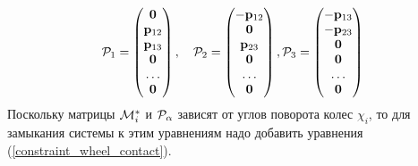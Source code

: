 $$ 
\mathcal{P}_1 = \left(
\begin{matrix}
 \boldsymbol{\mathbf{0}} \\
 \mathbf{p}_{12}\\
\mathbf{p}_{13}\\
\boldsymbol{\mathbf{0}}\\
\dots\\
\boldsymbol{\mathbf{0}}
\end{matrix}
\right),\quad
\mathcal{P}_2 = \left(
\begin{matrix}
-\mathbf{p}_{12}\\
\boldsymbol{\mathbf{0}}\\
\mathbf{p}_{23}\\
\boldsymbol{\mathbf{0}}\\
\dots\\
\boldsymbol{\mathbf{0}}
\end{matrix}
\right),
\mathcal{P}_3 = \left(
\begin{matrix}
-\mathbf{p}_{13}\\
-\mathbf{p}_{23}\\
\boldsymbol{\mathbf{0}}\\
\boldsymbol{\mathbf{0}}\\
\dots\\
\boldsymbol{\mathbf{0}}
\end{matrix}
\right)
$$
Поскольку матрицы $\mathcal{M}^*_i$ и $\mathcal{P}_\alpha$ зависят от углов поворота колес $\chi_i$, то для замыкания системы к этим уравнениям надо добавить уравнения
(\ref{constraint_wheel_contact}).

